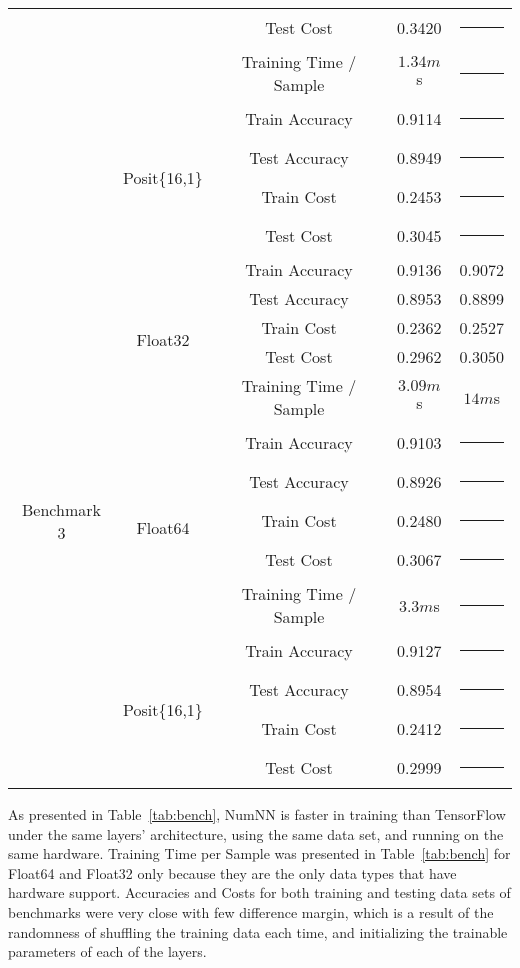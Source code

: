 \begin{table}[!htbp]
\begin{tabular}{|c | c | c || c | c |}
		& & Test Cost & 0.3420 & \rule{5em}{1pt} \\
		& & Training Time / Sample & $1.34m$s & \rule{5em}{1pt} \\\cline{2-5}
		& \multirow{4}{*}{Posit\{16,1\}} & Train Accuracy & 0.9114 & \rule{5em}{1pt} \\
		& & Test Accuracy & 0.8949 & \rule{5em}{1pt} \\
		& & Train Cost & 0.2453 & \rule{5em}{1pt} \\
		& & Test Cost & 0.3045 & \rule{5em}{1pt} \\\hline
		\multirow{14}{*}{Benchmark 3\footref{batchnorm}} & \multirow{5}{*}{Float32} & Train Accuracy & 0.9136 & 0.9072\\
		& & Test Accuracy & 0.8953 & 0.8899\\
		& & Train Cost & 0.2362 & 0.2527\\
		& & Test Cost & 0.2962 & 0.3050\\
		& & Training Time / Sample & $3.09m$s & $14m$s\\\cline{2-5}
		& \multirow{5}{*}{Float64} & Train Accuracy & 0.9103 & \rule{5em}{1pt} \\
		& & Test Accuracy & 0.8926 & \rule{5em}{1pt} \\
		& & Train Cost & 0.2480 & \rule{5em}{1pt} \\
		& & Test Cost & 0.3067 & \rule{5em}{1pt} \\
		& & Training Time / Sample & $3.3m$s & \rule{5em}{1pt} \\\cline{2-5}
		& \multirow{4}{*}{Posit\{16,1\}} & Train Accuracy & 0.9127 & \rule{5em}{1pt} \\
		& & Test Accuracy & 0.8954 & \rule{5em}{1pt} \\
		& & Train Cost & 0.2412 & \rule{5em}{1pt} \\
		& & Test Cost & 0.2999 & \rule{5em}{1pt} \\\hline		
	\end{tabular}
\end{table}

As presented in Table~\ref{tab:bench}, NumNN is faster in training than TensorFlow under the same layers' architecture, using the same data set, and running on the same hardware. Training Time per Sample was presented in Table~\ref{tab:bench} for Float64 and Float32 only because they are the only data types that have hardware support. Accuracies and Costs for both training and testing data sets of benchmarks were very close with few difference margin, which is a result of the randomness of shuffling the training data each time, and initializing the trainable parameters of each of the layers.
